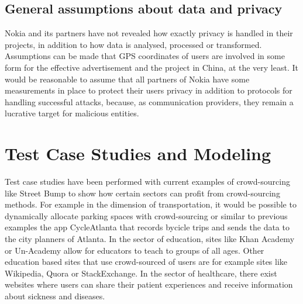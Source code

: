 \documentclass[a4paper,12pt]{report}
\begin{document}
		\subsection{General assumptions about data and privacy}
		\startsubsection
		Nokia and its partners have not revealed how exactly privacy is handled in their projects, in addition to how data is analysed, processed or transformed. Assumptions can be made that GPS coordinates of users are involved in some form for the effective advertisement and the project in China, at the very least. It would be reasonable to assume that all partners of Nokia have some measurements in place to protect their users privacy in addition to protocols for handling successful attacks, because, as communication providers, they remain a lucrative target for malicious entities.
		\closesection
		
	\closesection
	
	\section[Test Case Studies and Modeling]{Test Case Studies and Modeling \cite{CrowdSourcing}}
	\startsection
		Test case studies have been performed with current examples of crowd-sourcing like Street Bump to show how certain sectors can profit from crowd-sourcing methods. For example in the dimension of transportation, it would be possible to dynamically allocate parking spaces with crowd-sourcing or similar to previous examples the app CycleAtlanta that records bycicle trips and sends the data to the city planners of Atlanta. In the sector of education, sites like Khan Academy or Un-Academy allow for educators to teach to groups of all ages. Other education based sites that use crowd-sourced of users are for example sites like Wikipedia, Quora or StackExchange. In the sector of healthcare, there exist websites where users can share their patient experiences and receive information about sickness and diseases.
	\closesection
\end{document}
